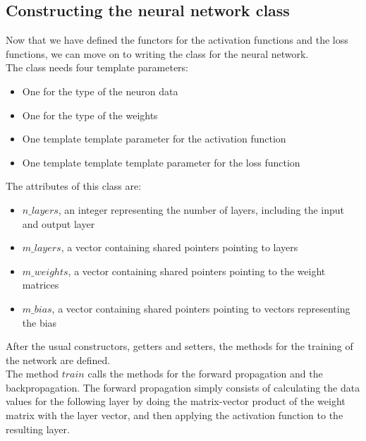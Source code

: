 \documentclass[12pt]{article}
\begin{document}


\subsection{Constructing the neural network class}
Now that we have defined the functors for the activation functions and the loss functions, we can move on to
writing the class for the neural network. \\
The class needs four template parameters:
\begin{itemize}
  \item One for the type of the neuron data
  \item One for the type of the weights
  \item One template template parameter for the activation function
  \item One template template template parameter for the loss function
\end{itemize}



\noindent The attributes of this class are:
\begin{itemize}
  \item $n\_layers$, an integer representing the number of layers, including the input and output layer
  \item $m\_layers$, a vector containing shared pointers pointing to layers
  \item $m\_weights$, a vector containing shared pointers pointing to the weight matrices
  \item $m\_bias$, a vector containing shared pointers pointing to vectors representing the bias
\end{itemize}
After the usual constructors, getters and setters, the methods for the training of the network are defined. \\
The method $train$ calls the methods for the forward propagation and the backpropagation. The forward 
propagation simply consists of calculating the data values for the following layer by doing the matrix-vector 
product of the weight matrix with the layer vector, and then applying the activation function to the 
resulting layer.
\end{document}
